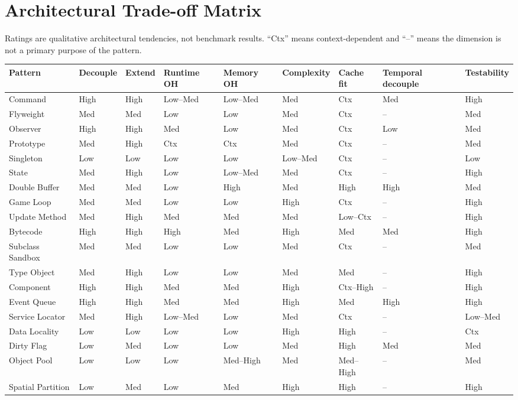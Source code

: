 \documentclass[11pt]{article}
\begin{document}
\section{Architectural Trade-off Matrix}\label{sec:tradeoffs}
Ratings are qualitative architectural tendencies, not benchmark results. ``Ctx'' means context-dependent and ``--'' means the dimension is not a primary purpose of the pattern.

\begin{landscape}
\scriptsize
\begin{longtable}{P{2.7cm}P{1.7cm}P{1.7cm}P{1.7cm}P{1.7cm}P{1.7cm}P{1.7cm}P{1.7cm}P{1.7cm}}
\toprule
\textbf{Pattern} & \textbf{Decouple} & \textbf{Extend} & \textbf{Runtime OH} & \textbf{Memory OH} & \textbf{Complexity} & \textbf{Cache fit} & \textbf{Temporal decouple} & \textbf{Testability}\\
\midrule
Command & High & High & Low--Med & Low--Med & Med & Ctx & Med & High\\
Flyweight & Med & Med & Low & Low & Med & Ctx & -- & Med\\
Observer & High & High & Med & Low & Med & Ctx & Low & Med\\
Prototype & Med & High & Ctx & Ctx & Med & Ctx & -- & Med\\
Singleton & Low & Low & Low & Low & Low--Med & Ctx & -- & Low\\
State & Med & High & Low & Low--Med & Med & Ctx & -- & High\\
Double Buffer & Med & Med & Low & High & Med & High & High & Med\\
Game Loop & Med & Med & Low & Low & High & Ctx & -- & High\\
Update Method & Med & High & Med & Med & Med & Low--Ctx & -- & High\\
Bytecode & High & High & High & Med & High & Med & Med & High\\
Subclass Sandbox & Med & Med & Low & Low & Med & Ctx & -- & Med\\
Type Object & Med & High & Low & Low & Med & Med & -- & High\\
Component & High & High & Med & Med & High & Ctx--High & -- & High\\
Event Queue & High & High & Med & Med & High & Med & High & High\\
Service Locator & Med & High & Low--Med & Low & Med & Ctx & -- & Low--Med\\
Data Locality & Low & Low & Low & Low & High & High & -- & Ctx\\
Dirty Flag & Low & Med & Low & Low & Med & High & Med & Med\\
Object Pool & Low & Low & Low & Med--High & Med & Med--High & -- & Med\\
Spatial Partition & Low & Med & Low & Med & High & High & -- & High\\
\bottomrule
\end{longtable}
\end{landscape}
\normalsize
\end{document}
